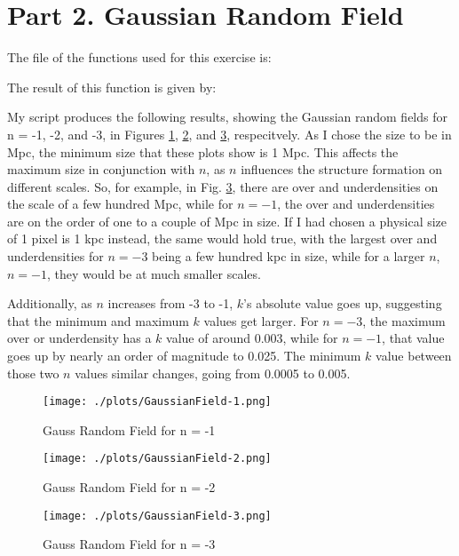 \section{Part 2. Gaussian Random Field}

The file of the functions used for this exercise is:



The result of this function is given by:

My script produces the following results, showing the Gaussian random fields for n = -1, -2, and -3, in Figures \ref{fig:gauss1}, \ref{fig:gauss2}, and \ref{fig:gauss3}, respecitvely.
As I chose the size to be in Mpc, the minimum size that these plots show is 1 Mpc. This affects the
maximum size in conjunction with $n$, as $n$ influences the structure formation on different scales. So, for example,
in Fig. \ref{fig:gauss3}, there are over and underdensities on the scale of a few hundred Mpc, while for
$n = -1$, the over and underdensities are on the order of one to a couple of Mpc in size. If I had chosen a physical size
of 1 pixel is 1 kpc instead, the same would hold true, with the largest over and underdensities for $n = -3$ being a few hundred kpc
in size, while for a larger $n$, $n = -1$, they would be at much smaller scales.

Additionally, as $n$ increases from -3 to -1, $k$'s absolute value goes up, suggesting that the minimum and maximum $k$
values get larger. For $n = -3$, the maximum over or underdensity has a $k$ value of around 0.003, while for $n = -1$, that value
goes up by nearly an order of magnitude to 0.025. The minimum $k$ value between those two $n$ values similar changes, going from 0.0005
to 0.005.


\begin{figure}[h!]
  \centering
  \texttt{[image: ./plots/GaussianField-1.png]}
  \caption{Gauss Random Field for n = -1}
  \label{fig:gauss1}
\end{figure}

\begin{figure}[h!]
  \centering
  \texttt{[image: ./plots/GaussianField-2.png]}
  \caption{Gauss Random Field for n = -2}
  \label{fig:gauss2}
\end{figure}

\begin{figure}[h!]
  \centering
  \texttt{[image: ./plots/GaussianField-3.png]}
  \caption{Gauss Random Field for n = -3}
  \label{fig:gauss3}
\end{figure}

